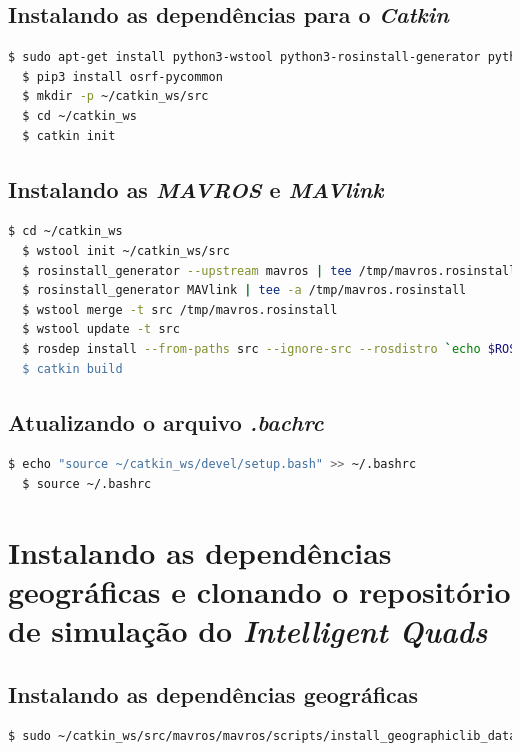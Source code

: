 \documentclass[12pt,a4paper,oneside]{book}
\begin{document}
\subsection{Instalando as dependências para o \textit{Catkin}}
\begin{lstlisting}[language=bash] 
  $ sudo apt-get install python3-wstool python3-rosinstall-generator python3-catkin-lint python3-pip python3-catkin-tools
  $ pip3 install osrf-pycommon
  $ mkdir -p ~/catkin_ws/src
  $ cd ~/catkin_ws
  $ catkin init
\end{lstlisting}

\subsection{Instalando as \textit{MAVROS} e \textit{MAVlink}}
\begin{lstlisting}[language=bash] 
  $ cd ~/catkin_ws
  $ wstool init ~/catkin_ws/src
  $ rosinstall_generator --upstream mavros | tee /tmp/mavros.rosinstall
  $ rosinstall_generator MAVlink | tee -a /tmp/mavros.rosinstall
  $ wstool merge -t src /tmp/mavros.rosinstall
  $ wstool update -t src
  $ rosdep install --from-paths src --ignore-src --rosdistro `echo $ROS_DISTRO' -y
  $ catkin build
\end{lstlisting}

\subsection{Atualizando o arquivo \textit{.bachrc}}
\begin{lstlisting}[language=bash] 
  $ echo "source ~/catkin_ws/devel/setup.bash" >> ~/.bashrc
  $ source ~/.bashrc
\end{lstlisting}

\section{Instalando as dependências geográficas e clonando o repositório de simulação do \textit{Intelligent Quads}}

\subsection{Instalando as dependências geográficas}
\begin{lstlisting}[language=bash] 
  $ sudo ~/catkin_ws/src/mavros/mavros/scripts/install_geographiclib_datasets.sh]
\end{lstlisting}
\end{document}
